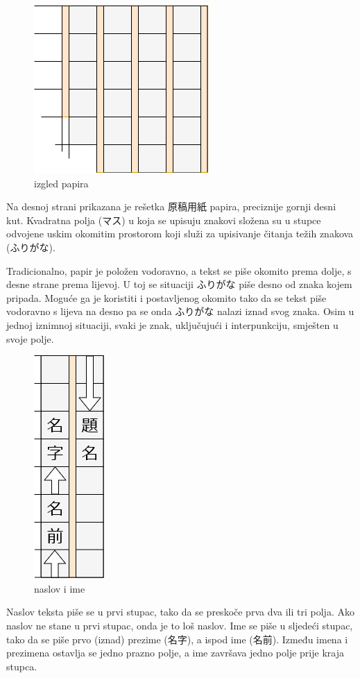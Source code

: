
\author{Tomislav Mamić}


	
		
	\begin{figure}
		\centering
		\includegraphics[width=.25\textwidth]{017_pisanje_res/a1.png}
		\caption{izgled papira}
	\end{figure}

	Na desnoj strani prikazana je rešetka 原稿用紙 papira, preciznije gornji desni kut. Kvadratna polja (マス) u koja se upisuju znakovi složena su u stupce odvojene uskim okomitim prostorom koji služi za upisivanje čitanja težih znakova (ふりがな).
	
	Tradicionalno, papir je položen vodoravno, a tekst se piše okomito prema dolje, s desne strane prema lijevoj. U toj se situaciji ふりがな piše desno od znaka kojem pripada. Moguće ga je koristiti i postavljenog okomito tako da se tekst piše vodoravno s lijeva na desno pa se onda ふりがな nalazi iznad svog znaka. Osim u jednoj iznimnoj situaciji, svaki je znak, uključujući i interpunkciju, smješten u svoje polje.
	
	\begin{figure}
		\centering
		\includegraphics[width=.1\textwidth]{017_pisanje_res/a2.png}
		\caption{naslov i ime}
	\end{figure}
	

	Naslov teksta piše se u prvi stupac, tako da se preskoče prva dva ili tri polja. Ako naslov ne stane u prvi stupac, onda je to loš naslov. Ime se piše u sljedeći stupac, tako da se piše prvo (iznad) prezime (名字), a ispod ime (名前). Između imena i prezimena ostavlja se jedno prazno polje, a ime završava jedno polje prije kraja stupca.
		
